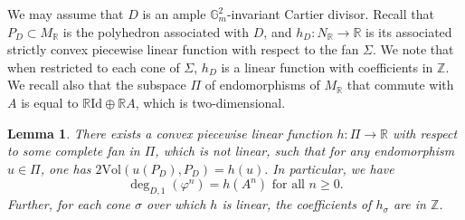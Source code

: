 \documentclass[11pt,a4paper]{article}
\theoremstyle{plain}
\newtheorem{lemma}[theorem]{Lemma}
\theoremstyle{remark}
\theoremstyle{custombold}
\begin{document}
 We may assume that $D$ is an ample $\mathbb G_m^2$-invariant Cartier divisor. Recall that $P_D\subset M_\mathbb R$ is the polyhedron associated with $D$, and $h_D\colon N_\mathbb R\rightarrow \mathbb R$ is its associated strictly convex piecewise linear function with respect to the fan $\Sigma$. We note that when restricted to each cone of $\Sigma$, $h_D$ is a linear function with coefficients in $\mathbb Z$. We recall also that the subspace $\Pi$ of endomorphisms of $M_\mathbb R$ that commute with $A$ is equal to $\mathbb R\mathrm{Id}\oplus\mathbb RA$, which is two-dimensional. 
\begin{lemma}\label{a formula for the 1-degree}
 There exists a convex piecewise linear function $h\colon\Pi\rightarrow \mathbb R$ with respect to some complete fan in $\Pi$, which is not linear, such that for any endomorphism $u\in\Pi$, one has
 $2\mathrm{Vol}(u(P_D),P_D)=h(u).$ In particular,  we have $$\deg_{D,1}(\varphi^n)=h(A^n)\text{ for all }n\geq0.$$
 Further, for each cone $\sigma$ over which $h$ is linear, the coefficients of $h_\sigma$ are in $\mathbb Z$.  
\end{lemma}
\end{document}
